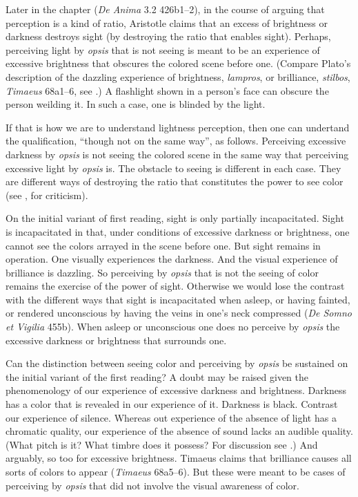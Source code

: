 Later in the chapter (\emph{De Anima} 3.2 426b1–2), in the course of arguing that perception is a kind of ratio, Aristotle claims that an excess of brightness or darkness destroys sight (by destroying the ratio that enables sight). Perhaps, perceiving light by \emph{opsis} that is not seeing is meant to be an experience of excessive brightness that obscures the colored scene before one. (Compare Plato's description of the dazzling experience of brightness, \emph{lampros}, or brilliance, \emph{stilbos}, \emph{Timaeus} 68a1–6, see \citealt[72–7]{Kalderon:2022kl}.) A flashlight shown in a person's face can obscure the person weilding it. In such a case, one is blinded by the light.

If that is how we are to understand lightness perception, then one can undertand the qualification, ``though not on the same way'', as follows. Perceiving excessive darkness by \emph{opsis} is not seeing the colored scene in the same way that perceiving excessive light by \emph{opsis} is. The obstacle to seeing is different in each case. They are different ways of destroying the ratio that constitutes the power to see color (see \citealt[275]{Ross:1961uq}, for criticism).

On the initial variant of first reading, sight is only partially incapacitated. Sight is incapacitated in that, under conditions of excessive darkness or brightness, one cannot see the colors arrayed in the scene before one. But sight remains in operation. One visually experiences the darkness. And the visual experience of brilliance is dazzling. So perceiving by \emph{opsis} that is not the seeing of color remains the exercise of the power of sight. Otherwise we would lose the contrast with the different ways that sight is incapacitated when asleep, or having fainted, or rendered unconscious by having the veins in one's neck compressed (\emph{De Somno et Vigilia} 455b). When asleep or unconscious one does no perceive by \emph{opsis} the excessive darkness or brightness that surrounds one.

Can the distinction between seeing color and perceiving by \emph{opsis} be sustained on the initial variant of the first reading? A doubt may be raised given the phenomenology of our experience of excessive darkness and brightness. Darkness has a color that is revealed in our experience of it. Darkness is black. Contrast our experience of silence. Whereas out experience of the absence of light has a chromatic quality, our experience of the absence of sound lacks an audible quality. (What pitch is it? What timbre does it possess? For discussion see \citealt{Sorensen:2008kx,Sorensen:2009aa}.) And arguably, so too for excessive brightness. Timaeus claims that brilliance causes all sorts of colors to appear (\emph{Timaeus} 68a5–6). But these were meant to be cases of perceiving by \emph{opsis} that did not involve the visual awareness of color.

